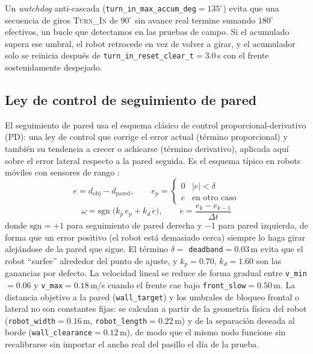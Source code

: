 \documentclass[conference]{IEEEtran}
\begin{document}
Un \emph{watchdog} anti-cascada (\texttt{turn\_in\_max\_accum\_deg}$=135^\circ$) evita que una secuencia de giros \textsc{Turn\_In} de $90^\circ$ sin avance real termine sumando $180^\circ$ efectivos, un bucle que detectamos en las pruebas de campo. Si el acumulado supera ese umbral, el robot retrocede en vez de volver a girar, y el acumulador solo se reinicia después de \texttt{turn\_in\_reset\_clear\_t}$=3.0$\,s con el frente sostenidamente despejado.

\subsection{Ley de control de seguimiento de pared}
El seguimiento de pared usa el esquema clásico de control proporcional-derivativo (PD): una ley de control que corrige el error actual (término proporcional) y también su tendencia a crecer o achicarse (término derivativo), aplicada aquí sobre el error lateral respecto a la pared seguida. Es el esquema típico en robots móviles con sensores de rango \cite{siegwart2011introduction,braunl2008embedded}:
\begin{equation}
e = d_{\text{obj}} - d_{\text{pared}}, \qquad
e_p = \begin{cases} 0 & |e| < \delta \\ e & \text{en otro caso} \end{cases}
\end{equation}
\begin{equation}
\omega = \mathrm{sgn}\;\big(k_p\, e_p + k_d\, \dot e\big), \qquad \dot e = \frac{e_k - e_{k-1}}{\Delta t}
\end{equation}
donde $\mathrm{sgn}=+1$ para seguimiento de pared derecha y $-1$ para pared izquierda, de forma que un error positivo (el robot está demasiado cerca) siempre lo haga girar alejándose de la pared que sigue. El término $\delta=$ \texttt{deadband}$=0.03$\,m evita que el robot ``surfee'' alrededor del punto de ajuste, y $k_p=0.70$, $k_d=1.60$ son las ganancias por defecto. La velocidad lineal se reduce de forma gradual entre \texttt{v\_min}$=0.06$ y \texttt{v\_max}$=0.18$\,m/s cuando el frente cae bajo \texttt{front\_slow}$=0.50$\,m. La distancia objetivo a la pared (\texttt{wall\_target}) y los umbrales de bloqueo frontal o lateral no son constantes fijas: se calculan a partir de la geometría física del robot (\texttt{robot\_width}$=0.16$\,m, \texttt{robot\_length}$=0.22$\,m) y de la separación deseada al borde (\texttt{wall\_clearance}$=0.12$\,m), de modo que el mismo nodo funcione sin recalibrarse sin importar el ancho real del pasillo el día de la prueba.
\end{document}
